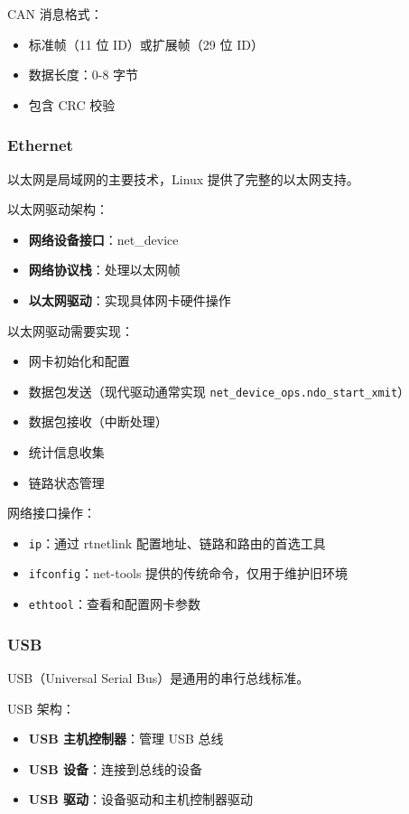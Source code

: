 CAN 消息格式：
\begin{itemize}
  \item 标准帧（11 位 ID）或扩展帧（29 位 ID）
  \item 数据长度：0-8 字节
  \item 包含 CRC 校验
\end{itemize}

\subsubsection{Ethernet}

以太网是局域网的主要技术，Linux 提供了完整的以太网支持。

以太网驱动架构：
\begin{itemize}
  \item \textbf{网络设备接口}：net\_device
  \item \textbf{网络协议栈}：处理以太网帧
  \item \textbf{以太网驱动}：实现具体网卡硬件操作
\end{itemize}

以太网驱动需要实现：
\begin{itemize}
  \item 网卡初始化和配置
  \item 数据包发送（现代驱动通常实现 \texttt{net\_device\_ops.ndo\_start\_xmit}）
  \item 数据包接收（中断处理）
  \item 统计信息收集
  \item 链路状态管理
\end{itemize}

网络接口操作：
\begin{itemize}
  \item \texttt{ip}：通过 rtnetlink 配置地址、链路和路由的首选工具
  \item \texttt{ifconfig}：net-tools 提供的传统命令，仅用于维护旧环境
  \item \texttt{ethtool}：查看和配置网卡参数
\end{itemize}

\subsubsection{USB}

USB（Universal Serial Bus）是通用的串行总线标准。

USB 架构：
\begin{itemize}
  \item \textbf{USB 主机控制器}：管理 USB 总线
  \item \textbf{USB 设备}：连接到总线的设备
  \item \textbf{USB 驱动}：设备驱动和主机控制器驱动
\end{itemize}

